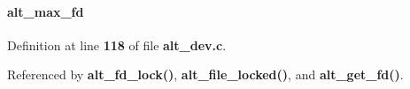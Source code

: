 \paragraph[{alt\+\_\+max\+\_\+fd}]{ alt\+\_\+max\+\_\+fd}\label{alt__file_8h_aefa50a1243bc074834e3140d00a7eca0}


Definition at line {\bf 118} of file {\bf alt\+\_\+dev.\+c}.



Referenced by {\bf alt\+\_\+fd\+\_\+lock()}, {\bf alt\+\_\+file\+\_\+locked()}, and {\bf alt\+\_\+get\+\_\+fd()}.

